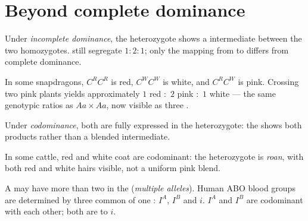 \section{Beyond complete dominance}

\begin{definition}\label{def:g11:mendelian-genetics:incomplete}
Under \emph{incomplete dominance}, the heterozygote
shows a  intermediate between the two homozygotes.  still
segregate $1:2:1$; only the mapping from  to  differs from
complete dominance.
\end{definition}

\begin{example}\label{ex:g11:mendelian-genetics:snapdragon}
In some snapdragons, $C^{R}C^{R}$ is red, $C^{W}C^{W}$ is white, and
$C^{R}C^{W}$ is pink. Crossing two pink plants yields approximately
$1$ red $:$ $2$ pink $:$ $1$ white --- the same genotypic ratios as
$Aa \times Aa$, now visible as three .
\end{example}

\begin{definition}[Codominance]\label{def:g11:mendelian-genetics:codominance}
Under \emph{codominance}, both  are fully expressed
in the heterozygote: the  shows both products rather than a blended
intermediate.
\end{definition}

\begin{example}\label{ex:g11:mendelian-genetics:roan}
In some cattle, red and white coat  are codominant: the heterozygote is
\emph{roan}, with both red and white hairs visible, not a uniform
pink blend.
\end{example}

\begin{definition}\label{def:g11:mendelian-genetics:ABO}
A  may have more than two  in the 
(\emph{multiple alleles}). Human ABO blood groups are
determined by three common  of one : $I^{A}$, $I^{B}$ and $i$.
$I^{A}$ and $I^{B}$ are codominant with each other; both are  to $i$.
\end{definition}

